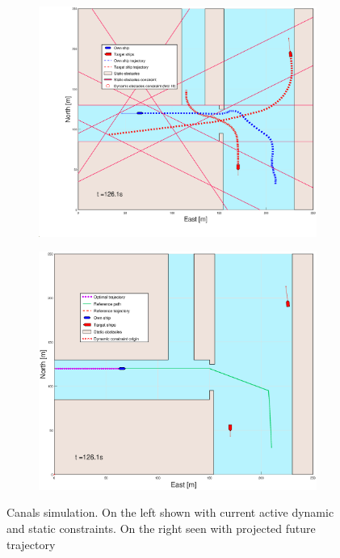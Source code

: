 \begin{figure}[ht]\ContinuedFloat
    \begin{subfigure}[b]{0.49\textwidth}
        \centering
        \includegraphics[width=\textwidth]{Images/Figures/Havn1/_Simple_0fig1_time=126}
    \end{subfigure}
    \hfill
    \begin{subfigure}[b]{0.499\textwidth}
        \centering
        \includegraphics[width=\textwidth]{Images/Figures/Havn1/_Simple_0fig999_time=126}
    \end{subfigure}
    \hfill
    \caption{Canals simulation. On the left shown with current active dynamic and static constraints. On the right seen with projected future trajectory}
\end{figure}

